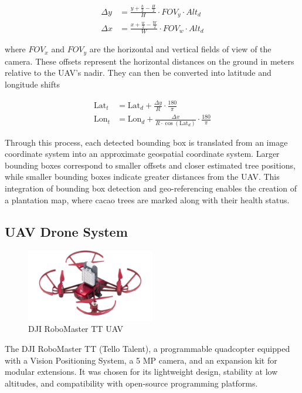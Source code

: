 \begin{align}
	\Delta y & = \frac{y + \frac{h}{2} - \frac{H}{2}}{H} \cdot FOV_y \cdot Alt_d \\
	\Delta x & = \frac{x + \frac{w}{2} - \frac{W}{2}}{W} \cdot FOV_w \cdot Alt_d
\end{align}

where $FOV_x$ and $FOV_y$ are the horizontal and vertical fields of view of the camera. These offsets represent the horizontal distances on the ground in meters relative to the UAV’s nadir. They can then be converted into latitude and longitude shifts


\begin{align}
	\text{Lat}_t & = \text{Lat}_d + \frac{\Delta y}{R} \cdot \frac{180}{\pi}                          \\
	\text{Lon}_t & = \text{Lon}_d + \frac{\Delta x}{R \cdot \cos(\text{Lat}_d)} \cdot \frac{180}{\pi}
\end{align}

Through this process, each detected bounding box is translated from an image coordinate system into an approximate geospatial coordinate system. Larger bounding boxes correspond to smaller offsets and closer estimated tree positions, while smaller bounding boxes indicate greater distances from the UAV. This integration of bounding box detection and geo-referencing enables the creation of a plantation map, where cacao trees are marked along with their health status.


\subsection*{UAV Drone System}

\begin{figure}[H]
	\centering
	\caption{DJI RoboMaster TT UAV}
	\label{fig:robomaster_tt}
	\includegraphics[width=0.5\textwidth]{figures/Robomaster_TT.pdf}
\end{figure}


The DJI RoboMaster TT (Tello Talent), a programmable quadcopter
equipped with a Vision Positioning System, a 5 MP camera, and an expansion kit for modular extensions.
It was chosen for its lightweight design, stability at low altitudes, and compatibility with open-source
programming platforms.

